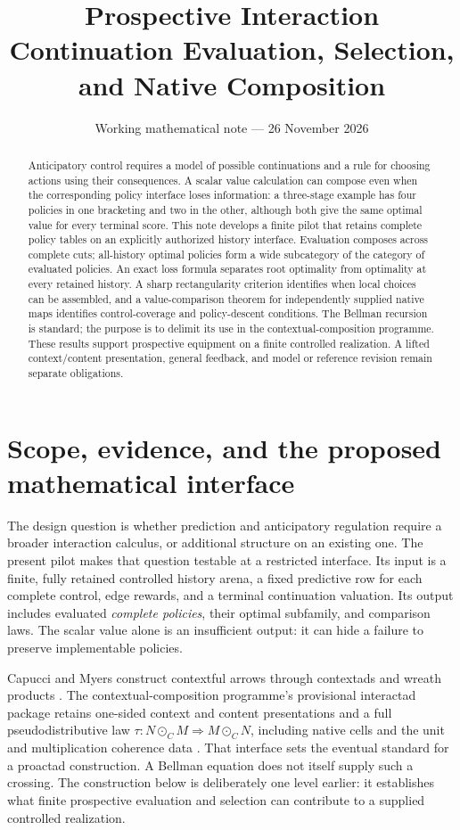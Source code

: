 \documentclass[11pt]{article}
\title{Prospective Interaction\\
\large Continuation Evaluation, Selection, and Native Composition}
\author{}
\date{Working mathematical note --- 26 November 2026}
\theoremstyle{definition}
\begin{document}
\maketitle
\vspace{-1.5em}
\begin{abstract}
Anticipatory control requires a model of possible continuations and a rule
for choosing actions using their consequences. A scalar value calculation
can compose even when the corresponding policy interface loses information:
a three-stage example has four policies in one bracketing and two in the
other, although both give the same optimal value for every terminal score.
This note develops a finite pilot that retains complete policy tables on an
explicitly authorized history interface. Evaluation composes across complete
cuts; all-history optimal policies form a wide subcategory of the category
of evaluated policies. An exact loss formula separates root optimality from
optimality at every retained history. A sharp rectangularity criterion
identifies when local choices can be assembled, and a value-comparison
theorem for independently supplied native maps identifies control-coverage and policy-descent
conditions. The Bellman recursion is standard; the purpose is to delimit its
use in the contextual-composition programme. These results support prospective
equipment on a finite controlled realization. A lifted context/content
presentation, general feedback, and model or reference revision remain
separate obligations.
\end{abstract}

\section{Scope, evidence, and the proposed mathematical interface}
\label{sec:scope}
The design question is whether prediction and anticipatory regulation require
a broader interaction calculus, or additional structure on an existing one.
The present pilot makes that question testable at a restricted interface.
Its input is a finite, fully retained controlled history arena, a fixed
predictive row for each complete control, edge rewards, and a terminal
continuation valuation. Its output includes evaluated \emph{complete policies},
their optimal subfamily, and comparison laws. The scalar value alone is an
insufficient output: it can hide a failure to preserve implementable policies.

Capucci and Myers construct contextful arrows through contextads and wreath
products \cite{contextads}. The contextual-composition programme's
provisional interactad package retains
one-sided context and content presentations and a full pseudodistributive law
\(\tau:N\odot_C M\Rightarrow M\odot_C N\), including native cells and the unit
and multiplication coherence data \cite{terminology,relative}. That interface
sets the eventual standard for a proactad construction. A Bellman equation
does not itself supply such a crossing. The construction below is deliberately
one level earlier: it establishes what finite prospective evaluation and
selection can contribute to a supplied controlled realization.
\end{document}

